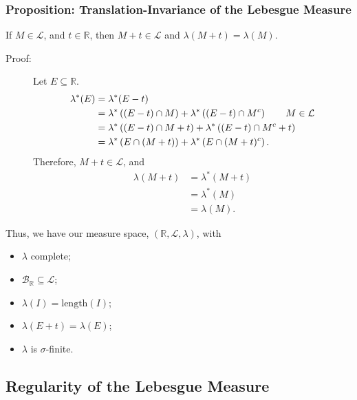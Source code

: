 \documentclass[9pt]{extarticle}
\newcommand{\R}{\mathbb{R}}
\begin{document}
  \subsubsection{Proposition: Translation-Invariance of the Lebesgue Measure}%
  If $M\in \mathcal{L}$, and $t\in \R$, then $M + t\in \mathcal{L}$ and $\lambda(M + t) = \lambda(M)$.
  \begin{description}
    \item[Proof:] Let $E\subseteq \R$.
      \begin{align*}
        \lambda^{\ast}(E) &= \lambda^{\ast}(E - t)\\
                          &= \lambda^{\ast}\left((E - t)\cap M\right) + \lambda^{\ast}\left((E-t)\cap M^{c}\right) \tag*{$M\in \mathcal{L}$}\\
                          &= \lambda^{\ast}\left((E-t)\cap M + t\right) + \lambda^{\ast}\left((E-t)\cap M^{c} + t\right)\\
                          &= \lambda^{\ast}\left(E\cap (M+t)\right) + \lambda^{\ast}\left(E\cap (M+t)^{c}\right).
      \end{align*}
      Therefore, $M+t\in \mathcal{L}$, and
      \begin{align*}
        \lambda(M+t) &= \lambda^{\ast}(M+t)\\
                     &= \lambda^{\ast}(M)\\
                     &= \lambda(M).
      \end{align*}
  \end{description}
  Thus, we have our measure space, $(\R,\mathcal{L},\lambda)$, with
  \begin{itemize}
    \item $\lambda$ complete;
    \item $\mathcal{B}_{\R}\subseteq \mathcal{L}$;
    \item $\lambda(I) = \text{length}(I)$;
    \item $\lambda(E+t) = \lambda(E)$;
    \item $\lambda$ is $\sigma$-finite.
  \end{itemize}
  \subsection{Regularity of the Lebesgue Measure}%
\end{document}
